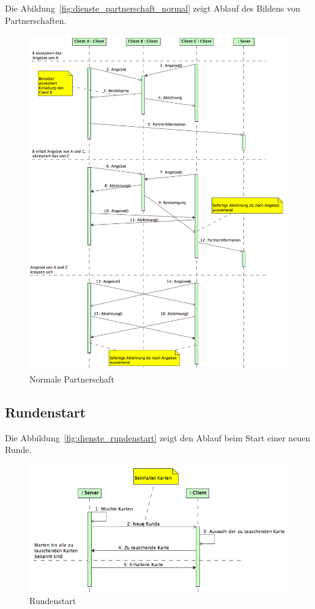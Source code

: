 \documentclass[12pt,halfparskip]{scrartcl}
\begin{document}
Die Abildung~\vref{fig:dienste_partnerschaft_normal} zeigt Ablauf des Bildens von Partnerschaften.
\begin{figure}[h]
	\centering
	\includegraphics[width=\textwidth]{dienste_partnerschaft_normal}
	\caption{Normale Partnerschaft}
	\label{fig:dienste_partnerschaft_normal}
\end{figure}

\subsection{Rundenstart} %
\label{sub:rundenstart}
Die Abbildung~\vref{fig:dienste_rundenstart} zeigt den Ablauf beim Start einer neuen Runde.
\begin{figure}[h]
	\centering
	\includegraphics[width=\textwidth]{dienste_rundenstart}
	\caption{Rundenstart}
	\label{fig:dienste_rundenstart}
\end{figure}
\end{document}
